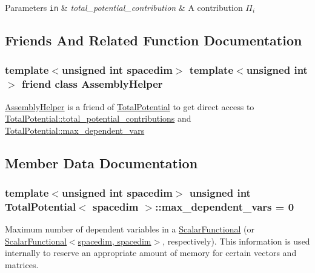 \begin{DoxyParams}[1]{Parameters}
\mbox{\tt in}  & {\em total\+\_\+potential\+\_\+contribution} & A contribution $\Pi_i$ \\
\hline
\end{DoxyParams}


\subsection{Friends And Related Function Documentation}
\subsubsection[{\texorpdfstring{Assembly\+Helper}{AssemblyHelper}}]{\setlength{\rightskip}{0pt plus 5cm}template$<$unsigned int spacedim$>$ template$<$unsigned int$>$ friend class {\bf Assembly\+Helper}\hspace{0.3cm}{\ttfamily [friend]}}\hypertarget{class_total_potential_af4019c2e39cc934d646aaa35c3c52773}{}\label{class_total_potential_af4019c2e39cc934d646aaa35c3c52773}
\hyperlink{class_assembly_helper}{Assembly\+Helper} is a friend of \hyperlink{class_total_potential}{Total\+Potential} to get direct access to \hyperlink{class_total_potential_a5a14ce0e2fabf8116566aa67fb11db35}{Total\+Potential\+::total\+\_\+potential\+\_\+contributions} and \hyperlink{class_total_potential_a800f9366116679fd0f7d3173a3bfc539}{Total\+Potential\+::max\+\_\+dependent\+\_\+vars} 

\subsection{Member Data Documentation}
\subsubsection[{\texorpdfstring{max\+\_\+dependent\+\_\+vars}{max_dependent_vars}}]{\setlength{\rightskip}{0pt plus 5cm}template$<$unsigned int spacedim$>$ unsigned int {\bf Total\+Potential}$<$ spacedim $>$\+::max\+\_\+dependent\+\_\+vars = 0\hspace{0.3cm}{\ttfamily [private]}}\hypertarget{class_total_potential_a800f9366116679fd0f7d3173a3bfc539}{}\label{class_total_potential_a800f9366116679fd0f7d3173a3bfc539}
Maximum number of dependent variables in a \hyperlink{class_scalar_functional}{Scalar\+Functional} (or \hyperlink{class_scalar_functional_3_01spacedim_00_01spacedim_01_4}{Scalar\+Functional$<$spacedim, spacedim$>$}, respectively). This information is used internally to reserve an appropriate amount of memory for certain vectors and matrices. 
